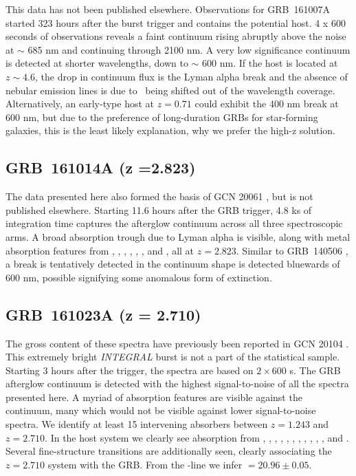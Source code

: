 \documentclass{aa}    %
\begin{document}
This data has not been published elsewhere. Observations for GRB~161007A started
323 hours after the burst trigger and contains the potential host. 4 x 600
seconds of observations reveals a faint continuum rising abruptly above the
noise at $\sim$ 685 nm and continuing through 2100 nm. A very low significance
continuum is detected at shorter wavelengths, down to $\sim$ 600 nm. If the host
is located at $z \sim 4.6$, the drop in continuum flux is the Lyman alpha break
and the absence of nebular emission lines is due to \oii~being shifted out of
the wavelength coverage. Alternatively, an early-type host at $z = 0.71$ could
exhibit the 400 nm break at 600 nm, but due to the preference of long-duration
GRBs for star-forming galaxies, this is the least likely explanation, why we
prefer the high-z solution.

\subsection{GRB~161014A (z =2.823)} \label{161014}

The data presented here also formed the basis of GCN  20061 \citep{GCN20061},
but is not published elsewhere. Starting 11.6 hours after the GRB trigger, 4.8
ks of integration time captures the afterglow continuum across all three
spectroscopic arms. A broad absorption trough due to Lyman alpha is visible,
along with metal absorption features from \mgii, \SIii, \cii, \civ, \alii,
\aliii, and	\feii, all at $z =2.823$. Similar to GRB~140506 \citep{Fynbo2014,
	Heintz2017b},  a break is tentatively detected in the continuum shape is
detected bluewards of 600 nm, possible signifying some anomalous form of
extinction.


\subsection{GRB~161023A (z = 2.710)}\label{161023}

The gross content of these spectra have previously been reported in GCN 20104
\citep{GCN20104}. This extremely bright \textit{INTEGRAL} burst is not a part of
the statistical sample. Starting 3 hours after the trigger, the spectra are
based on $2 \times 600$ s. The GRB afterglow continuum is detected with the
highest signal-to-noise of all the spectra presented here. A myriad of
absorption features are visible against the continuum, many which would not be
visible against lower signal-to-noise spectra. We identify at least 15
intervening absorbers between $z = 1.243$ and $z = 2.710$. In the host system we
clearly see absorption from \lyb, \lya, \sii, \SIii, \oi, \SIiv, \civ, \alii,
\aliii, \feii, \mgii, and \mgi. Several fine-structure transitions are
additionally seen, clearly associating the $z = 2.710$ system with the GRB. From
the \lya-line we infer \nh$=20.96 \pm 0.05$.
\end{document}
